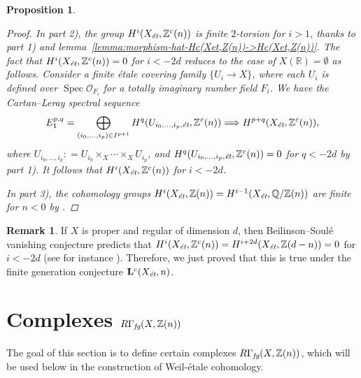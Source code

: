 \documentclass[leqno,12pt]{article}
\theoremstyle{plain}
\newtheorem{proposition}[theorem]{\indent\sc Proposition}
\theoremstyle{definition}
\newtheorem{remark}[theorem]{\indent\sc Remark}
\DeclareMathOperator{\Spec}{Spec}
\newcommand{\QQ}{\mathbb{Q}}
\newcommand{\RR}{\mathbb{R}}
\newcommand{\ZZ}{\mathbb{Z}}
\newcommand{\dfn}{\mathrel{\mathop:}=}
\newcommand{\et}{\text{\it \'{e}t}}
\newcommand{\fg}{\text{\it fg}}
\begin{document}
\begin{proposition}
\begin{proof}
    In part 2), the group $H^i (X_\et, \ZZ^c (n))$ is finite $2$-torsion for
    $i > 1$, thanks to part 1) and
    lemma~\ref{lemma:morphism-hat-Hc(Xet,Z(n))->Hc(Xet,Z(n))}. The fact that
    $H^i (X_\et, \ZZ^c (n)) = 0$ for $i < -2d$ reduces to the case of
    $X (\RR) = \emptyset$ as follows. Consider a finite \'{e}tale covering family
    $\{ U_i \to X \}$, where each $U_i$ is defined over
    $\Spec \mathcal{O}_{F_i}$ for a totally imaginary number field $F_i$.
    We have the Cartan--Leray spectral sequence
    \[ E_1^{p,q} = \bigoplus_{(i_0,\ldots,i_p) \in I^{p+1}} H^q (U_{i_0,\ldots,i_p, \et}, \ZZ^c (n))
      \Longrightarrow H^{p+q} (X_\et, \ZZ^c (n)), \]
    where $U_{i_0,\ldots,i_p} \dfn U_{i_0} \times_X \cdots \times_X U_{i_p}$, and
    $H^q (U_{i_0,\ldots,i_p, \et}, \ZZ^c (n)) = 0$ for $q < -2d$ by part 1).
    It follows that $H^i (X_\et, \ZZ^c (n))$ for $i < -2d$.

    In part 3), the cohomology groups
    $H^i (X_\et, \ZZ (n)) = H^{i-1} (X_\et, \QQ/\ZZ (n))$ are finite for $n < 0$
    by \cite[Theorem~3]{Kahn-2003}.
  \end{proof}
\end{proposition}

\begin{remark}
  If $X$ is proper and regular of dimension $d$, then Beilinson--Soul\'{e}
  vanishing conjecture predicts that
  $H^i (X_\et, \ZZ^c (n)) = H^{i+2d} (X_\et, \ZZ (d-n)) = 0$ for $i < -2d$
  (see for instance \cite[\S 4.3.4]{Kahn-2005}). Therefore, we just proved that
  this is true under the finite generation conjecture $\mathbf{L}^c (X_\et, n)$.
\end{remark}


\section{Complexes $R\Gamma_\fg (X, \ZZ(n))$}
\label{sec:RGamma-fg}

The goal of this section is to define certain complexes
$R\Gamma_\fg (X, \ZZ(n))$, which will be used below in the construction of
Weil-étale cohomology.
\end{document}
